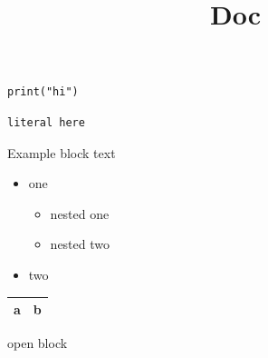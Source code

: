 \documentclass[11pt,a4paper]{article}
\title{Doc}
\begin{document}
\maketitle

\begin{verbatim}
print("hi")
\end{verbatim}

\begin{verbatim}
literal here
\end{verbatim}

Example block text

\begin{itemize}
\item one
  \begin{itemize}
\item nested one
\item nested two
  \end{itemize}
\item two
\end{itemize}

\begin{table}[h]
\begin{tabular}{|l|l|}
\hline
a & b \\ \hline
\end{tabular}
\end{table}

open block
\end{document}
